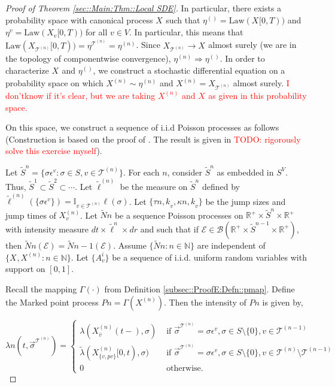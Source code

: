 \documentclass[12pt]{article}
\newcommand{\mb}{\mathbb}
\newcommand{\mc}{\mathcal}
\newcommand{\ms}{\mathscr}
\newcommand{\ra}{\rightarrow}
\newcommand{\ov}{\overline}
\newcommand{\te}{\text}
\newcommand{\ep}{\epsilon}
\newcommand{\tr}{\textcolor{red}}
\newcommand{\ind}{\hspace{24pt}}
\renewcommand{\v}{v}							%
\renewcommand{\S}{S}							%
\newcommand{\s}{\sigma}							%
\newcommand{\sv}{\vec{\s}}						%
\newcommand{\ev}{\ep}							%
\newcommand{\T}{T}								%
\renewcommand{\t}{t}							%
\newcommand{\X}{X}								%
\newcommand{\vind}[1]{^{#1}}					%
\newcommand{\carp}[1]{^{#1}}					%
\newcommand{\vsi}[1]{^{#1}}						%
\newcommand{\cind}[1]{_{#1}}					%
\newcommand{\cl}{\ov}							%
\newcommand{\tp}[1]{(#1)}						%
\newcommand{\tip}[1]{#1}						%
\newcommand{\ts}[1]{_{#1}}						%
\newcommand{\tree}{\mc{T}}						%
\newcommand{\sln}[1]{^{(#1)}}						%
\newcommand{\poiss}{N}							%
\newcommand{\Sm}{\ell}							%
\newcommand{\rate}{\lambda}						%
\renewcommand{\r}{r}							%
\newcommand{\alt}[1]{\widetilde{#1}}			%
\newcommand{\mmm}{\eta}							%
\newcommand{\law}{\te{Law}}						%
\newcommand{\rt}{\tau}							%
\renewcommand{\it}{k}							%
\newcommand{\evnt}{\mc{E}}						%
\newcommand{\rv}{A}								%
\newcommand{\pmap}{\Gamma}						%
\renewcommand{\mark}{\kappa}					%
\newcommand{\rp}{P}								%
\newcommand{\crate}{\alt{\lambda}}				%
\newcommand{\p}{p}								%
\begin{document}
\begin{proof}[Proof of Theorem \ref{sec::Main:Thm::Local SDE}]
\ind In particular, there exists a probability space with canonical process \(\X\cind{}\tip{}\) such that \(\mmm\sln{}\ts{} = \law(\X\cind{}\tip{[0,\T)})\) and \(\mmm\vind{\v}\ts{} = \law(\X\cind{\v}\tip{[0,\T)})\) for all \(\v \in V\). In particular, this means that \(\law(\X\cind{\tree\sln{n}}\tip{[0,\T)}) = \mmm\vind{\tree\sln{n}}\ts{} = \mmm\sln{n}\ts{}\). Since \(\X\cind{\tree\sln{n}}\tip{} \ra \X\cind{}\tip{}\) almost surely (we are in the topology of componentwise convergence), \(\mmm\sln{n}\ts{} \Rightarrow \mmm\sln{}\ts{}\). In order to characterize \(\X\cind{}\tip{}\) and \(\mmm\sln{}\ts{}\), we construct a stochastic differential equation on a probability space on which \(\X\sln{n}\cind{}\tip{} \sim \mmm\sln{n}\ts{}\) and \(\X\sln{n}\cind{}\tip{} = \X\cind{\tree\sln{n}}\tip{}\) almost surely. \tr{I don'\t know if it's clear, but we are taking \(\X\sln{n}\cind{}\tip{}\) and \(\X\cind{}\tip{}\) as given in this probability space.}

\ind On this space, we construct a sequence of i.i.d Poisson processes as follows (Construction is based on the proof of \cite[Theorem 14.7.1(b)]{DalVer08}. The result is given in \cite[Exercise 14.7.1]{DalVer08} \tr{TODO: rigorously solve this exercise myself}).

\ind Let \(\alt{\S}^n = \{\s\ev\vind{\v}: \s\in\S,\v \in \tree\sln{n}\}\). For each \(n\), consider \(\alt{\S}^n\) as embedded in \(\S\carp{V}\). Thus, \(\alt{\S}^1 \subset \alt{\S}^2 \subset \cdots\). Let \(\alt{\Sm}\sln{n}\) be the measure on \(\alt{\S}^n\) defined by \(\alt{\Sm}\sln{n}(\{\s\ev\vind{\v}\}) = \mb{I}_{\v \in \tree\sln{n}}\Sm(\s)\). Let \(\{\rt{n,\it}_\v,\mark{n,\it}_{\v}\}\) be the jump sizes and jump times of \(\X\sln{n}\cind{\v}\tip{}\). Let \(\alt{\poiss}{n}\) be a sequence Poisson processes on \(\mb{R}^+\times\alt{\S}^n\times \mb{R}^+\) with intensity measure \(d\t\times\alt{\Sm}^n\times d\r\) and such that if \(\evnt{} \in \ms{B}(\mb{R}^+\times\alt{\S}^{n-1}\times \mb{R}^+)\), then \(\alt{\poiss}{n}(\evnt{}) = \alt{\poiss}{n-1}(\evnt{})\). Assume \(\{\alt{\poiss}{n}:n\in\mb{N}\}\) are independent of \(\{\X\cind{}\tip{},\X\sln{n}\cind{}\tip{}:n\in\mb{N}\}\). Let \(\{\rv_{\v}^{i}\}\) be a sequence of i.i.d. uniform random variables with support on \([0,1]\).

\ind Recall the mapping \(\pmap{}(\cdot)\) from Definition \ref{subsec::ProofE:Defn::pmap}. Define the Marked point process \(\rp{n} = \pmap{}(\X\sln{n}\cind{}\tip{})\). Then the intensity of \(\rp{n}\) is given by,

\[\rate{n}(\t,\sv\cind{}\vsi{\tree\sln{n}}) = \begin{cases}
\rate{}(\X\sln{n}\cind{\cl{\v}}\tp{\t-},\s) &\te{ if } \sv\cind{}\vsi{\tree\sln{n}} = \s\ev\vind{\v},\s \in \S\setminus\{0\},\v\in\tree\sln{n-1}\\
\crate{}{}(\X\sln{n}\cind{\{\v,\p{\v}\}}\tip{[0,\t)},\s) &\te{ if } \sv\cind{}\vsi{\tree\sln{n}} = \s\ev\vind{\v},\s\in\S\setminus\{0\},\v\in\tree\sln{n}\setminus\tree\sln{n-1}\\
0 &\te{ otherwise.}
\end{cases}\]


\end{proof}
\end{document}
